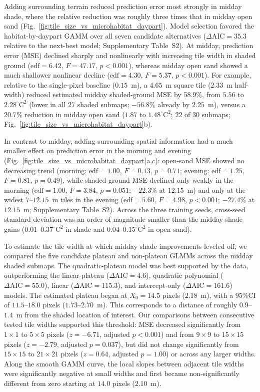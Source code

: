\documentclass[12pt]{article}
\begin{document}
\noindent Adding surrounding terrain reduced prediction error most strongly in midday shade, where the relative reduction was roughly three times that in midday open sand (Fig.~\ref{fig:tile_size_vs_microhabitat_daypart}). Model selection favored the habitat-by-daypart GAMM over all seven candidate alternatives ($\Delta\text{AIC} = 35.3$ relative to the next-best model; Supplementary Table~S2). At midday, prediction error (MSE) declined sharply and nonlinearly with increasing tile width in shaded ground ($\text{edf} = 6.42$, $F = 47.17$, $p < 0.001$), whereas midday open sand showed a much shallower nonlinear decline ($\text{edf} = 4.30$, $F = 5.37$, $p < 0.001$). For example, relative to the single-pixel baseline ($0.15$~m), a $4.65$~m square tile ($2.33$~m half-width) reduced estimated midday shaded-ground MSE by 58.9\%, from $5.56$ to $2.28^{\circ}\mathrm{C}^2$ (lower in all $27$ shaded submaps; $-56.8\%$ already by $2.25$~m), versus a 20.7\% reduction in midday open sand ($1.87$ to $1.48^{\circ}\mathrm{C}^2$; $22$ of $30$ submaps; Fig.~\ref{fig:tile_size_vs_microhabitat_daypart}b). 

In contrast to midday, adding surrounding spatial information had a much smaller effect on prediction error in the morning and evening (Fig.~\ref{fig:tile_size_vs_microhabitat_daypart}a,c): open-sand MSE showed no decreasing trend (morning: $\text{edf} = 1.00$, $F = 0.13$, $p = 0.71$; evening: $\text{edf} = 1.25$, $F = 0.81$, $p = 0.49$), while shaded-ground MSE declined only weakly in the morning ($\text{edf} = 1.00$, $F = 3.84$, $p = 0.051$; $-22.3\%$ at $12.15$~m) and only at the widest $7$--$12.15$~m tiles in the evening ($\text{edf} = 5.60$, $F = 4.98$, $p < 0.001$; $-27.4\%$ at $12.15$~m; Supplementary Table~S2). Across the three training seeds, cross-seed standard deviation was an order of magnitude smaller than the midday shade gains ($0.01$--$0.37^{\circ}\mathrm{C}^2$ in shade and $0.04$--$0.15^{\circ}\mathrm{C}^2$ in open sand).

To estimate the tile width at which midday shade improvements leveled off, we compared the five candidate plateau and non-plateau GLMMs across the midday shaded submaps. The quadratic-plateau model was best supported by the data, outperforming the linear-plateau ($\Delta\text{AIC} = 4.6$), quadratic polynomial ($\Delta\text{AIC} = 55.0$), linear ($\Delta\text{AIC} = 115.3$), and intercept-only ($\Delta\text{AIC} = 161.6$) models. The estimated plateau began at $X_0 = 14.5$ pixels ($2.18$~m), with a 95\%CI of $11.5$--$18.0$ pixels ($1.73$--$2.70$~m). This corresponds to a distance of roughly $0.9$--$1.4$~m from the shaded location of interest. Our comparisons between consecutive tested tile widths supported this threshold: MSE decreased significantly from $1\times1$ to $5\times5$ pixels ($z = -6.71$, adjusted $p < 0.001$) and from $9\times9$ to $15\times15$ pixels ($z = -2.79$, adjusted $p = 0.037$), but did not change significantly from $15\times15$ to $21\times21$ pixels ($z = 0.64$, adjusted $p = 1.00$) or across any larger widths. Along the smooth GAMM curve, the local slopes between adjacent tile widths were  significantly negative at small widths and first became non-significantly different from zero starting at $14.0$ pixels ($2.10$~m).
\end{document}

